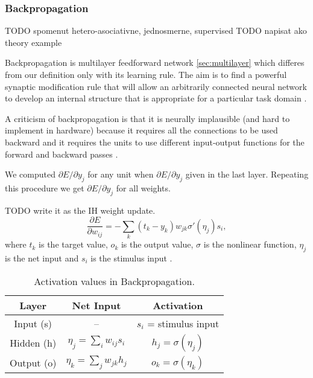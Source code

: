 \subsubsection{Backpropagation}

TODO spomenut hetero-asociativne, jednosmerne, supervised 
TODO napisat ako theory example

Backpropagation is multilayer feedforward network \ref{sec:multilayer} which differes from our definition only with its learning rule. The aim is to find a powerful synaptic modification rule that will allow an arbitrarily connected neural network to develop an internal structure that is appropriate for a particular task domain \citep{rumelhart1986learning}. 

A criticism of backpropagation is that it is neurally implausible (and hard to implement in hardware) because it requires all the connections to be used backward and it requires the units to use different input-output functions for the forward and backward passes \citep{hinton1988learning}.

We computed $\partial E / \partial y_j$ for any unit when $\partial E / \partial y_j$ given in the last layer. Repeating this procedure we get $\partial E / \partial y_j$ for all weights. 

TODO write it as the IH weight update. 
\begin{equation} 
\frac{\partial E}{\partial w_{ij}} = -\sum_k(t_k-y_k)w_{jk}\sigma'(\eta_j)s_i,
\end{equation}
where $t_k$ is the target value, $o_k$ is the output value, $\sigma$ is the nonlinear function, $\eta_j$ is the net input and $s_i$ is the stimulus input \citet{o1996bio}.

\begin{table}
  \centering
  \begin{tabular}{|ccc|}
    \hline
    Layer & Net Input & Activation\\
    \hline
    Input (s)  & -- & $s_i$ = stimulus input\\
    \hline
    Hidden (h) & \hspace{0.3cm} $\eta_j = \sum_i w_{ij}s_i$ \hspace{0.3cm} &
    $h_j = \sigma(\eta_j)$\hspace{0.3cm}\\
    \hline
    Output (o) & \hspace{0.3cm} $\eta_k = \sum_j w_{jk}h_j$ \hspace{0.3cm} & 
    $o_k = \sigma(\eta_k)$\hspace{0.3cm}\\
    \hline
  \end{tabular}
  \caption{Activation values in Backpropagation.}
  \label{tab:models-bp}
\end{table}
